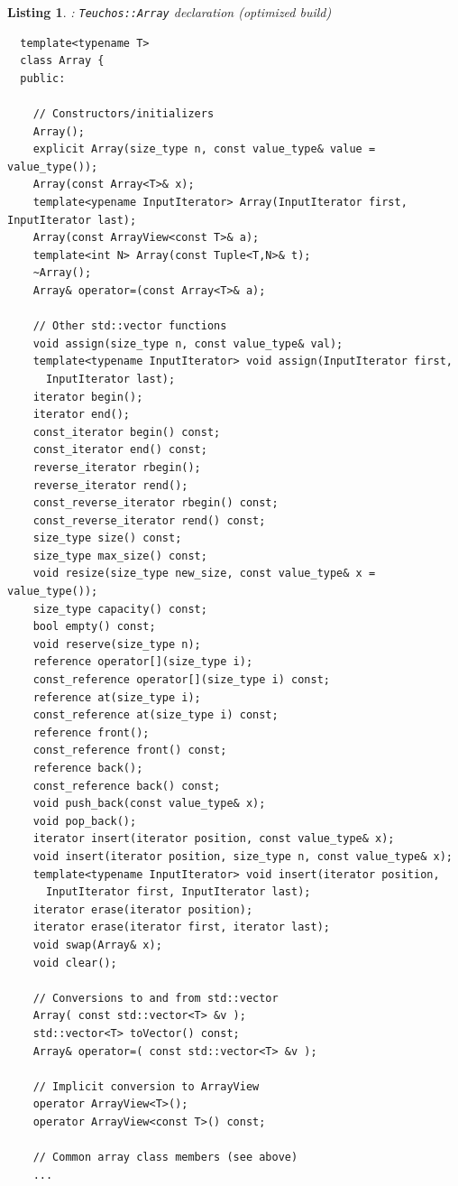 \documentclass[pdf,ps2pdf,11pt]{SANDreport}
\newtheorem{listing}{Listing}
\begin{document}
\begin{listing}: {}\texttt{Teuchos::Array} declaration (optimized build) \\
\label{listing:Array}
{\small\begin{verbatim}
  template<typename T>
  class Array {
  public:
  
    // Constructors/initializers
    Array();
    explicit Array(size_type n, const value_type& value = value_type());
    Array(const Array<T>& x);
    template<ypename InputIterator> Array(InputIterator first, InputIterator last);
    Array(const ArrayView<const T>& a);
    template<int N> Array(const Tuple<T,N>& t);
    ~Array();
    Array& operator=(const Array<T>& a);
  
    // Other std::vector functions
    void assign(size_type n, const value_type& val);
    template<typename InputIterator> void assign(InputIterator first,
      InputIterator last);
    iterator begin();
    iterator end();
    const_iterator begin() const;
    const_iterator end() const;
    reverse_iterator rbegin();
    reverse_iterator rend();
    const_reverse_iterator rbegin() const;
    const_reverse_iterator rend() const;
    size_type size() const;
    size_type max_size() const;
    void resize(size_type new_size, const value_type& x = value_type());
    size_type capacity() const;
    bool empty() const;
    void reserve(size_type n);
    reference operator[](size_type i);
    const_reference operator[](size_type i) const;
    reference at(size_type i);
    const_reference at(size_type i) const;
    reference front();
    const_reference front() const;
    reference back();
    const_reference back() const;
    void push_back(const value_type& x);
    void pop_back();
    iterator insert(iterator position, const value_type& x);
    void insert(iterator position, size_type n, const value_type& x);
    template<typename InputIterator> void insert(iterator position,
      InputIterator first, InputIterator last);
    iterator erase(iterator position);
    iterator erase(iterator first, iterator last);
    void swap(Array& x);
    void clear();
  
    // Conversions to and from std::vector
    Array( const std::vector<T> &v );
    std::vector<T> toVector() const;
    Array& operator=( const std::vector<T> &v );

    // Implicit conversion to ArrayView
    operator ArrayView<T>();
    operator ArrayView<const T>() const;
  
    // Common array class members (see above)
    ...
  

\end{verbatim}}
\end{listing}
\end{document}
